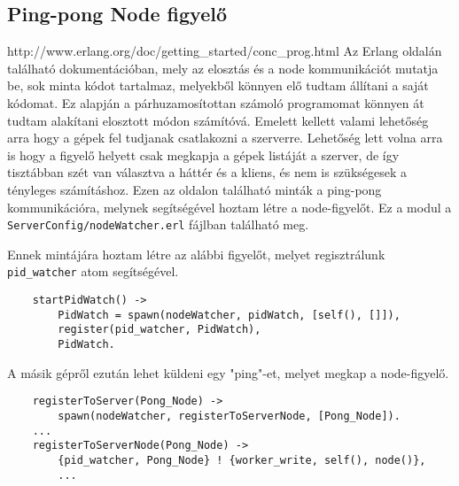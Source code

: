 \subsection{Ping-pong Node figyelő}
	http://www.erlang.org/doc/getting\_started/conc\_prog.html
	Az Erlang oldalán található dokumentációban, mely az elosztás és a node kommunikációt mutatja be, sok minta kódot tartalmaz, melyekből könnyen elő tudtam állítani a saját kódomat.\newline
	Ez alapján a párhuzamosítottan számoló programomat könnyen át tudtam alakítani elosztott módon számítóvá. \newline 
	Emelett kellett valami lehetőség arra hogy a gépek fel tudjanak csatlakozni a szerverre. Lehetőség lett volna arra is hogy a figyelő helyett csak megkapja a gépek listáját a szerver, de így tisztábban szét van választva a háttér és a kliens, és nem is szükségesek a tényleges számításhoz. \newline
	Ezen az oldalon található minták a ping-pong kommunikációra, melynek segítségével hoztam létre a node-figyelőt. Ez a modul a \texttt{ServerConfig/nodeWatcher.erl} fájlban található meg. \newline

	Ennek mintájára hoztam létre az alábbi figyelőt, melyet regisztrálunk \texttt{pid\_watcher} atom segítségével. 
	\begin{verbatim}
	startPidWatch() ->
	    PidWatch = spawn(nodeWatcher, pidWatch, [self(), []]),
	    register(pid_watcher, PidWatch),
	    PidWatch.
	\end{verbatim}

	A másik gépről ezután lehet küldeni egy "ping"-et, melyet megkap a node-figyelő.
	\begin{verbatim}
	registerToServer(Pong_Node) ->
	    spawn(nodeWatcher, registerToServerNode, [Pong_Node]).
	...
	registerToServerNode(Pong_Node) -> 
	    {pid_watcher, Pong_Node} ! {worker_write, self(), node()},
	    ...
	\end{verbatim}


